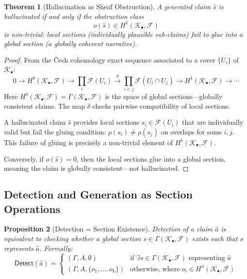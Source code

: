 \documentclass[11pt,a4paper]{article}
\theoremstyle{plain}
\newtheorem{theorem}{Theorem}[section]
\newtheorem{proposition}[theorem]{Proposition}
\theoremstyle{definition}
\theoremstyle{remark}
\newcommand{\Detect}{\mathsf{Detect}}
\begin{document}
\begin{theorem}[Hallucination as Sheaf Obstruction]\label{thm:sheaf-obstruction}
A generated claim $\hat{s}$ is hallucinated if and only if the obstruction class
\[
o(\hat{s}) \in H^1(\mathcal{K}_\bullet, \mathcal{F})
\]
is non-trivial: local sections (individually plausible sub-claims) fail to glue into a global section (a globally coherent narrative).
\end{theorem}

\begin{proof}
From the \v{C}ech cohomology exact sequence associated to a cover $\{U_i\}$ of $\mathcal{K}_\bullet$:
\[
0 \to H^0(\mathcal{K}_\bullet, \mathcal{F}) \to \prod_i \mathcal{F}(U_i) \xrightarrow{\delta} \prod_{i < j} \mathcal{F}(U_i \cap U_j) \to H^1(\mathcal{K}_\bullet, \mathcal{F}) \to \cdots
\]
Here $H^0(\mathcal{K}_\bullet, \mathcal{F}) = \Gamma(\mathcal{K}_\bullet, \mathcal{F})$ is the space of global sections---globally consistent claims. The map $\delta$ checks pairwise compatibility of local sections.

A hallucinated claim $\hat{s}$ provides local sections $s_i \in \mathcal{F}(U_i)$ that are individually valid but fail the gluing condition: $\rho(s_i) \neq \rho(s_j)$ on overlaps for some $i, j$. This failure of gluing is precisely a non-trivial element of $H^1(\mathcal{K}_\bullet, \mathcal{F})$.

Conversely, if $o(\hat{s}) = 0$, then the local sections glue into a global section, meaning the claim is globally consistent---not hallucinated.
\end{proof}

\subsection{Detection and Generation as Section Operations}

\begin{proposition}[Detection = Section Existence]\label{prop:detect-section}
Detection of a claim $\hat{a}$ is equivalent to checking whether a global section $s \in \Gamma(\mathcal{K}_\bullet, \mathcal{F})$ exists such that $s$ represents $\hat{a}$. Formally:
\[
\Detect(\hat{a}) = \begin{cases}
(\Gamma, A, \emptyset) & \text{if } \exists s \in \Gamma(\mathcal{K}_\bullet, \mathcal{F}) \text{ representing } \hat{a} \\
(\Gamma, A, \{o_1, \ldots, o_k\}) & \text{otherwise, where } o_i \in H^n(\mathcal{K}_\bullet, \mathcal{F})
\end{cases}
\]
\end{proposition}
\end{document}
